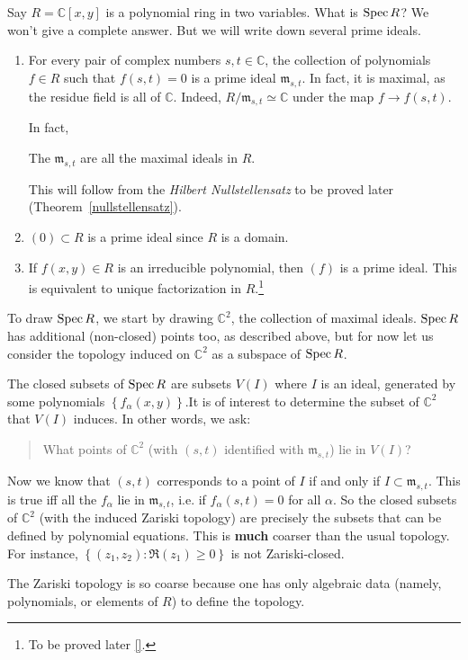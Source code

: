 \begin{example} \label{twovarpoly}
Say $R = \mathbb{C}[x,y]$ is a polynomial ring in two variables.
What is
$\operatorname{Spec} R$? We won't give a complete answer. But we will write
down several
prime ideals.

\begin{enumerate}
\item For every pair of complex numbers $s,t \in \mathbb{C}$,
the collection of polynomials
$f \in R$ such that $f(s,t) = 0$ is a prime ideal $\mathfrak{m}
_{s,t}$. In
fact, it is maximal, as the residue field is all of
$\mathbb{C}$. Indeed,
$R/\mathfrak{m}_{s,t} \simeq \mathbb{C}$ under the map $f \to
f(s,t)$.

In fact, 
\begin{theorem}
The $\mathfrak{m}_{s,t}$ are all the maximal ideals in $R$.
\end{theorem} 
This will follow from the \emph{Hilbert Nullstellensatz} to be
proved later
(Theorem~\ref{nullstellensatz}).
\item $(0) \subset R$ is a prime ideal since $R$ is a domain. 
\item If $f(x,y) \in R$ is an irreducible polynomial, then $(f)$
is a prime
ideal. This is equivalent to unique factorization in
$R$.\footnote{To be
proved later \ref{}.}  
\end{enumerate}

To draw $\operatorname{Spec} R$, we start by drawing $\mathbb{C}^2$, the
collection of
maximal ideals. $\operatorname{Spec} R$ has additional (non-closed) points
too, as
described above, but for now let us
consider the topology induced on $\mathbb{C}^2$ as a subspace of
$\operatorname{Spec} R$.

The closed subsets of $\operatorname{Spec} R$ are subsets $V(I)$ where $I$ is
an ideal,
generated by some polynomials $\left\{f_{\alpha}(x,y)\right\}$.It is of interest to determine the subset of $\mathbb{C}^2$ that
$V(I)$
induces. In other words, we ask:
\begin{quote}
What points of $\mathbb{C}^2$ (with $(s,t)$ identified with
$\mathfrak{m}_{s,t}$) lie in $V(I)$?
\end{quote}
Now we know that $(s,t)$ corresponds to a point of $I$ if and
only if $I
\subset \mathfrak{m}_{s,t}$.
This is true iff all the
$f_{\alpha} $ lie in $ \mathfrak{m}_{s,t}$, i.e. if
$f_{\alpha}(s,t) =0$ for all
$\alpha$. So the closed subsets of $\mathbb{C}^2$ (with the
induced Zariski
topology) are precisely the subsets
that can be defined by polynomial equations. This is
\textbf{much} coarser
than the usual topology. For instance, $\left\{(z_1,z_2):
\Re(z_1) \geq 0\right\}$ is
not Zariski-closed. 

The Zariski topology is so coarse because one has only algebraic
data (namely,
polynomials, or elements of $R$) to define the topology.
\end{example} 


